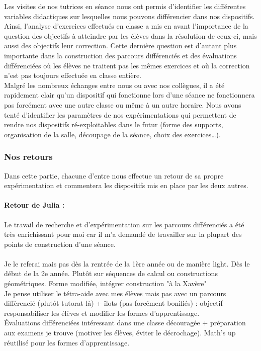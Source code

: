 Les visites de nos tutrices en séance nous ont permis d'identifier les différentes variables didactiques sur lesquelles nous pouvons différencier dans nos dispositifs. Ainsi, l'analyse d'exercices effectués en classe a mis en avant l'importance de la question des objectifs à atteindre par les élèves dans la résolution de ceux-ci, mais aussi des objectifs leur correction. Cette dernière question est d'autant plus importante dans la construction des parcours différenciés et des évaluations différenciées où les élèves ne traitent pas les mêmes exercices et où la correction n'est pas toujours effectuée en classe entière.\\
Malgré les nombreux échanges entre nous ou avec nos collègues, il a été rapidement clair qu'un dispositif qui fonctionne lors d'une séance ne fonctionnera pas forcément avec une autre classe ou même à un autre horaire. Nous avons tenté d'identifier les paramètres de nos expérimentations qui permettent de rendre nos dispositifs ré-exploitables dans le futur (forme des supports, organisation de la salle, découpage de la séance, choix des exercices\ldots).

\subsubsection{Nos retours}
Dans cette partie, chacune d'entre nous effectue un retour de sa propre expérimentation et commentera les dispositifs mis en place par les deux autres. \\
\paragraph*{Retour de Julia :}
Le travail de recherche et d'expérimentation sur les parcours différenciés a été très enrichissant pour moi car il m'a demandé de travailler sur la plupart des points de construction d'une séance. \\
\\
Je le referai mais pas dès la rentrée de la 1ère année ou de manière light. Dès le début de la 2e année. Plutôt sur séquences de calcul ou constructions géométriques. Forme modifiée, intégrer construction "à la Xavère"\\
Je pense utiliser le tétra-aide avec mes élèves mais pas avec un parcours différencié (plutôt tutorat là) + îlots (pas forcément bonifiés) : objectif responsabiliser les élèves et modifier les formes d'apprentissage.\\
Évaluations différenciées intéressant dans une classe découragée + préparation aux examens je trouve (motiver les élèves, éviter le décrochage).
Math's up réutilisé pour les formes d'apprentissage.

